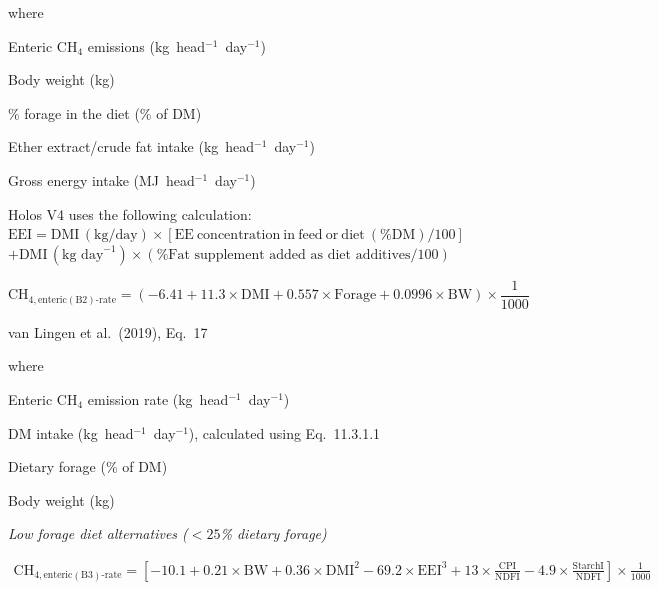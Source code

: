 \noindent where
\begin{description}[font=\normalfont, leftmargin=9em, style=sameline, nosep]
    \item[$\mathrm{CH}_{4,\mathrm{enteric}(\mathrm{B1})\mathrm{\text{-}rate}}$]
          Enteric CH$_4$ emissions (kg~head$^{-1}$~day$^{-1}$)
    \item[$\mathrm{BW}$] Body weight (kg)
    \item[$\mathrm{Forage}$] \% forage in the diet (\% of DM)
    \item[$\mathrm{EEI}$] Ether extract/crude fat intake (kg~head$^{-1}$~day$^{-1}$)
    \item[$\mathrm{GEI}$] Gross energy intake (MJ~head$^{-1}$~day$^{-1}$)
\end{description}

\noindent Holos V4 uses the following calculation:
$\mathrm{EEI} = \mathrm{DMI}\,(\text{kg/day}) \times [\mathrm{EE\ concentration\ in\ feed\ or\ diet}\ (\%\mathrm{DM})/100]$
$+ \mathrm{DMI}\,(\text{kg~day}^{-1}) \times (\%\text{Fat supplement added as diet additives}/100)$

\begin{equation}
    \mathrm{CH}_{4,\mathrm{enteric}(\mathrm{B2})\mathrm{\text{-}rate}} =
        \left(-6.41 + 11.3 \times \mathrm{DMI}
            + 0.557 \times \mathrm{Forage}
            + 0.0996 \times \mathrm{BW}\right)
        \times \frac{1}{1000}
    \tag{Eq.\ 3.1.1.15}
\end{equation}

\noindent van Lingen et al.\ (2019), Eq.~17

\noindent where
\begin{description}[font=\normalfont, leftmargin=9em, style=sameline, nosep]
    \item[$\mathrm{CH}_{4,\mathrm{enteric}(\mathrm{B2})\mathrm{\text{-}rate}}$]
          Enteric CH$_4$ emission rate (kg~head$^{-1}$~day$^{-1}$)
    \item[$\mathrm{DMI}$] DM intake (kg~head$^{-1}$~day$^{-1}$), calculated using
          Eq.~11.3.1.1
    \item[$\mathrm{Forage}$] Dietary forage (\% of DM)
    \item[$\mathrm{BW}$] Body weight (kg)
\end{description}

\noindent\textit{Low forage diet alternatives ($< 25$\% dietary forage)}

\begin{multline}
    \mathrm{CH}_{4,\mathrm{enteric}(\mathrm{B3})\mathrm{\text{-}rate}} =
        \left[-10.1 + 0.21 \times \mathrm{BW}
            + 0.36 \times \mathrm{DMI}^{2}
            - 69.2 \times \mathrm{EEI}^{3}
            + 13 \times \frac{\mathrm{CPI}}{\mathrm{NDFI}}
            - 4.9 \times \frac{\mathrm{StarchI}}{\mathrm{NDFI}}\right]
        \times \frac{1}{1000}
    \tag{Eq.\ 3.1.1.16}
\end{multline}

